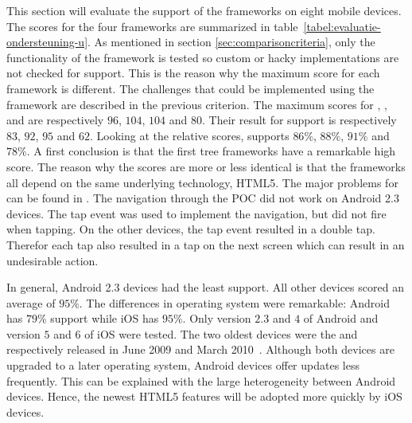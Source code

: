 \documentclass[a4paper]{artikel3}
\begin{document}
This section will evaluate the support of the frameworks on eight mobile devices.
The scores for the four frameworks are summarized in table~\ref{tabel:evaluatie-ondersteuning-u}.
As mentioned in section \ref{sec:comparisoncriteria},  only the functionality of the framework is tested so custom or hacky implementations are not checked for support.
This is the reason why the maximum score for each framework is different.
The challenges that could be implemented using the framework are described in the previous criterion.
The maximum scores for \sta{},  \kendoa{},  \jqma{} and \lungo{} are respectively $96$, $104$, $104$ and $80$.
Their result for support is respectively $83$, $92$, $95$ and $62$.
Looking at the relative scores,  \sta{} supports $86\%$,  \kendoa{} $88\%$,  \jqma{} $91\%$ and \lungo{} $78\%$.
A first conclusion is that the first tree frameworks have a remarkable high score.
The reason why the scores are more or less identical is that the frameworks all depend on the same underlying technology,  HTML5.
The major problems for \lungo{} can be found in .
The navigation through the POC did not work on Android 2.3 devices. 
The tap event was used to implement the navigation, but did not fire when tapping.
On the other devices, the tap event resulted in a double tap.
Therefor each tap also resulted in a tap on the next screen which can result in an undesirable action.

In general,  Android 2.3 devices had the least support.
All other devices scored an average of $95\%$.
The differences in operating system were remarkable:  Android has $79\%$ support while iOS has $95\%$.
Only version $2.3$ and $4$ of Android and version $5$ and $6$ of iOS were tested.
The two oldest devices were the \iphoneiii{} and \gs{} respectively released in June 2009 and March 2010~\cite{Staff2009,Gideon2010}.
Although both devices are upgraded to a later operating system,  Android devices offer updates less frequently.
This can be explained with the large heterogeneity between Android devices.
Hence, the newest HTML5 features will be adopted more quickly by iOS devices.

\begin{table}[t]
\centering
{}
\caption{Overview of performance.}
\label{tabel:evaluatie-performantie}
\end{table}
\end{document}
